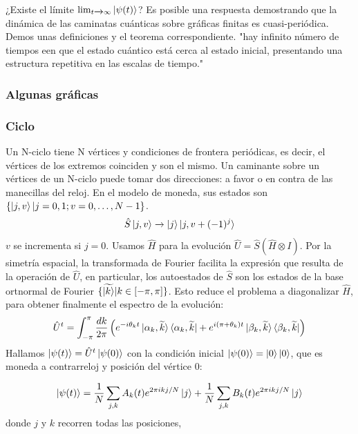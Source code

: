 ¿Existe el límite $\lim_{t\xrightarrow{}\infty}\ket{\psi(t)}$? Es posible una respuesta demostrando que la dinámica de las caminatas cuánticas sobre gráficas finitas es cuasi-periódica. Demos unas definiciones y el teorema correspondiente. "hay infinito número de tiempos een que el estado cuántico está cerca al estado inicial, presentando una estructura repetitiva en las escalas de tiempo."\\


\subsubsection{Algunas gráficas}

\subsubsection*{Ciclo}
Un N-ciclo tiene N vértices y condiciones de frontera periódicas, es decir, el vértices de los extremos coinciden y son el mismo. Un caminante sobre un vértices de un N-ciclo puede tomar dos direcciones: a favor o en contra de las manecillas del reloj. En el modelo de moneda, sus estados son $\{\ket{j,v}|j=0,1;v=0,\dots,N-1\}$.
\begin{equation}
    \hat{S}\ket{j,v}\xrightarrow{}\ket{j}\ket{j,v+(-1)^j}
\end{equation}{}
$v$ se incrementa si $j=0$. Usamos $\hat{H}$ para la evolución $\hat{U}=\hat{S}(\hat{H}\otimes I)$. Por la simetría espacial, la transformada de Fourier facilita la expresión que resulta de la operación de $\hat{U}$, en particular, los autoestados de $\hat{S}$
son los estados de la base ortnormal de Fourier $\{\widetilde{\ket{k}}|k\in [-\pi,\pi] \}$. Esto reduce el problema a diagonalizar $\hat{H}$, para obtener finalmente el espectro de la evolución:
\begin{equation}
    \hat{U}^t=\int_{-\pi}^\pi\frac{dk}{2\pi}\left(e^{-i\theta_kt}\ket{\alpha_k,\widetilde{k}}\bra{\alpha_k,\widetilde{k}}+e^{i(\pi+\theta_k)t}\ket{\beta_k,\widetilde{k}}\bra{\beta_k,\widetilde{k}}\right)
\end{equation}{}
Hallamos $\ket{\psi(t)}=\hat{U}^t\ket{\psi(0)}$ con la condición inicial $\ket{\psi(0)}=\ket{0}\ket{0}$, que es moneda a contrarreloj y posición del vértice $0$:

\begin{equation}
\ket{\psi(t)}=\dfrac{1}{N}    \sum_{j,k}A_k(t)e^{2\pi ikj/N}\ket{j}+\dfrac{1}{N}    \sum_{j,k}B_k(t)e^{2\pi ikj/N}\ket{j}
\end{equation}
donde $j$ y $k$ recorren todas las posiciones,

